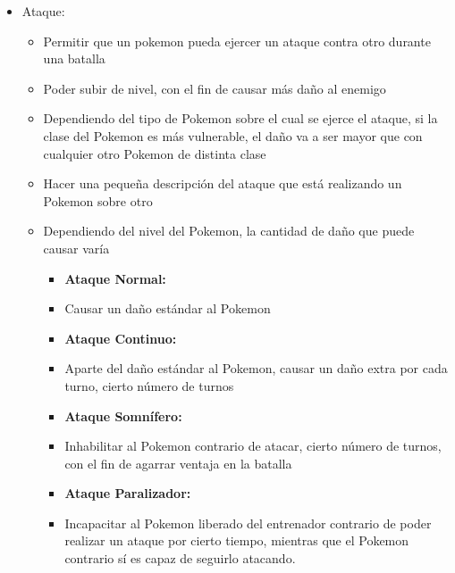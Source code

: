\documentclass[a4paper,11pt]{report}
\begin{document}
\begin{itemize}
\item Ataque:
\begin{itemize}
\item Permitir que un pokemon pueda ejercer un ataque contra otro durante una batalla
\item Poder subir de nivel, con el fin de causar más daño al enemigo
\item Dependiendo del tipo de Pokemon sobre el cual se ejerce el ataque, si la clase del Pokemon es más vulnerable, el daño va a ser mayor que con cualquier otro Pokemon de distinta clase
\item Hacer una pequeña descripción del ataque que está realizando un Pokemon sobre otro
\item Dependiendo del nivel del Pokemon, la cantidad de daño que puede causar varía
\begin{itemize}
\item \textbf{Ataque Normal:}
\item Causar un daño estándar al Pokemon
\item \textbf{Ataque Continuo:}
\item Aparte del daño estándar al Pokemon, causar un daño extra por cada turno, cierto número de turnos
\item \textbf{Ataque Somnífero:}
\item Inhabilitar al Pokemon contrario de atacar, cierto número de turnos, con el fin de agarrar ventaja en la batalla
\item \textbf{Ataque Paralizador:}
\item Incapacitar al Pokemon liberado del entrenador contrario de poder realizar un ataque por cierto tiempo, mientras que el Pokemon contrario sí es capaz de seguirlo atacando.
\end{itemize}

\end{itemize}

\end{itemize}
\end{document}
